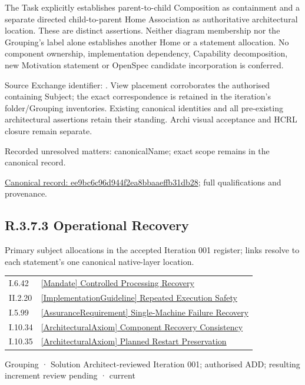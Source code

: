 The Task explicitly establishes parent-to-child Composition as containment and
a separate directed child-to-parent Home Association as authoritative architectural
location. These are distinct assertions. Neither diagram membership nor the
Grouping's label alone establishes another Home or a statement allocation.
No component ownership, implementation dependency, Capability decomposition,
new Motivation statement or OpenSpec candidate incorporation is conferred.



Source Exchange identifier: \texttt{}. View placement corroborates
the authorised containing Subject; the exact correspondence is retained in the
iteration's folder/Grouping inventories. Existing canonical identities and all
pre-existing architectural assertions retain their standing. Archi visual
acceptance and HCRL closure remain separate.


{\small Recorded unresolved matters: canonicalName; exact scope remains in the canonical record.}\par
{\footnotesize \href{../../../../continuum/grouping/ee9bc6c96d944f2ea8bbaaeffb31db28.md}{Canonical record: ee9bc6c96d944f2ea8bbaaeffb31db28}; full qualifications and provenance.}\par
\subsection*{R.3.7.3 Operational Recovery}
\label{navigation:R.3.7.3}

Primary subject allocations in the accepted Iteration 001 register; links resolve to each statement’s one canonical native-layer location.\par
\begin{longtable}{p{.22\linewidth}p{.73\linewidth}}
I.6.42 & \hyperref[element:014a4549398d49ee81eadb7108598f48]{[Mandate] Controlled Processing Recovery} \\
II.2.20 & \hyperref[element:be3bd95296c2427a870980a0e12adb41]{[ImplementationGuideline] Repeated Execution Safety} \\
I.5.99 & \hyperref[element:0d13da9390a3438ca887a4293bb034b9]{[AssuranceRequirement] Single-Machine Failure Recovery} \\
I.10.34 & \hyperref[element:545465b03f794a509c932bd3126fbe57]{[ArchitecturalAxiom] Component Recovery Consistency} \\
I.10.35 & \hyperref[element:0ce24ee595a445e5b1a95e54aa9f1eac]{[ArchitecturalAxiom] Planned Restart Preservation} \\
\end{longtable}
\label{element:8609b046777c4a8ab4d5cafb30e34d04}
{\small Grouping · Solution Architect-reviewed Iteration 001; authorised ADD; resulting increment review pending · current}\par

